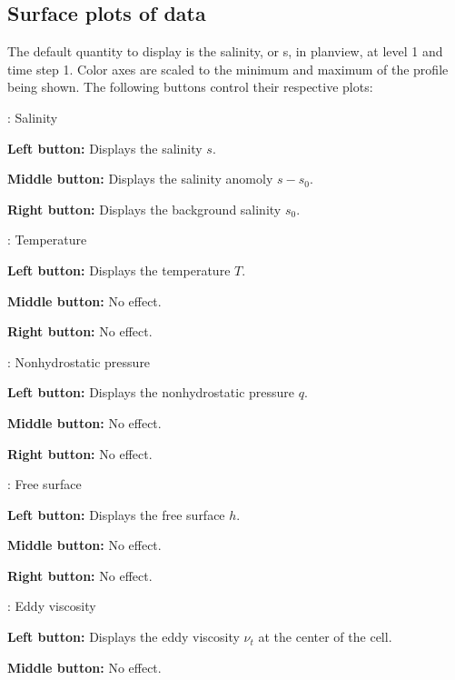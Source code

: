 \documentclass[12pt,oneside]{article}
\begin{document}
\subsection{Surface plots of data}

The default quantity to display is the salinity, or s, in planview, at level 1 and time step 1.  Color axes
are scaled to the minimum and maximum of the profile being shown.  The following
buttons control their respective plots:
\begin{list}{}
\item {}: Salinity
\begin{list}{}
\item {\bf Left button:} Displays the salinity $s$.
\item {\bf Middle button:} Displays the salinity anomoly $s-s_0$.
\item {\bf Right button:} Displays the background salinity $s_0$.
\end{list}
\item {}: Temperature
\begin{list}{}
\item {\bf Left button:} Displays the temperature $T$.
\item {\bf Middle button:} No effect.
\item {\bf Right button:} No effect.
\end{list}
\item {}: Nonhydrostatic pressure
\begin{list}{}
\item {\bf Left button:} Displays the nonhydrostatic pressure $q$.
\item {\bf Middle button:} No effect.
\item {\bf Right button:} No effect.
\end{list}
\item {}: Free surface
\begin{list}{}
\item {\bf Left button:} Displays the free surface $h$.
\item {\bf Middle button:} No effect.
\item {\bf Right button:} No effect.
\end{list}
\item {}:  Eddy viscosity 
\begin{list}{}
\item {\bf Left button:} Displays the eddy viscosity $\nu_t$ at the center of the cell.
\item {\bf Middle button:} No effect.

\end{list}
\end{list}
\end{document}
